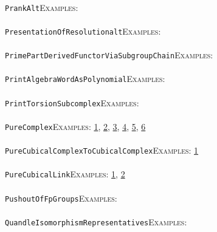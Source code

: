 \documentclass[a4paper,11pt]{report}
\begin{document}
{{ \\
 \texttt{PrankAlt}{\nobreakspace}{\nobreakspace}{\nobreakspace}{\nobreakspace}\textsc{Examples:} \\
 \\
 \texttt{PresentationOfResolution{\textunderscore}alt}{\nobreakspace}{\nobreakspace}{\nobreakspace}{\nobreakspace}\textsc{Examples:} \\
 \\
 \texttt{PrimePartDerivedFunctorViaSubgroupChain}{\nobreakspace}{\nobreakspace}{\nobreakspace}{\nobreakspace}\textsc{Examples:} \\
 \\
 \texttt{PrintAlgebraWordAsPolynomial}{\nobreakspace}{\nobreakspace}{\nobreakspace}{\nobreakspace}\textsc{Examples:} \\
 \\
 \texttt{PrintTorsionSubcomplex}{\nobreakspace}{\nobreakspace}{\nobreakspace}{\nobreakspace}\textsc{Examples:} \\
 \\
 \texttt{PureComplex}{\nobreakspace}{\nobreakspace}{\nobreakspace}{\nobreakspace}\textsc{Examples:} \href{tutorial/chap2.html} {1}{\nobreakspace}, \href{tutorial/chap3.html} {2}{\nobreakspace}, \href{../www/SideLinks/About/aboutPeripheral.html} {3}{\nobreakspace}, \href{../www/SideLinks/About/aboutCoveringSpaces.html} {4}{\nobreakspace}, \href{../www/SideLinks/About/aboutCoverinSpaces.html} {5}{\nobreakspace}, \href{../www/SideLinks/About/aboutCubical.html} {6}{\nobreakspace} \\
 \\
 \texttt{PureCubicalComplexToCubicalComplex}{\nobreakspace}{\nobreakspace}{\nobreakspace}{\nobreakspace}\textsc{Examples:} \href{../www/SideLinks/About/aboutCubical.html} {1}{\nobreakspace} \\
 \\
 \texttt{PureCubicalLink}{\nobreakspace}{\nobreakspace}{\nobreakspace}{\nobreakspace}\textsc{Examples:} \href{tutorial/chap3.html} {1}{\nobreakspace}, \href{../www/SideLinks/About/aboutCoverinSpaces.html} {2}{\nobreakspace} \\
 \\
 \texttt{PushoutOfFpGroups}{\nobreakspace}{\nobreakspace}{\nobreakspace}{\nobreakspace}\textsc{Examples:} \\
 \\
 \texttt{QuandleIsomorphismRepresentatives}{\nobreakspace}{\nobreakspace}{\nobreakspace}{\nobreakspace}\textsc{Examples:} \\
 \\
}}
\end{document}
